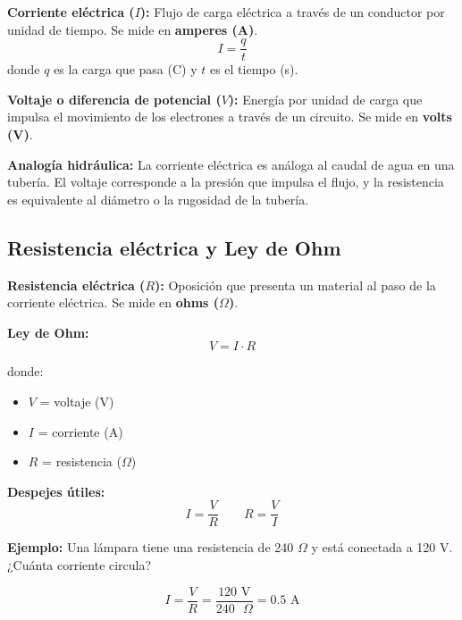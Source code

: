 \begin{seccion}
\begin{definicion}
\textbf{Corriente eléctrica ($I$):} Flujo de carga eléctrica a través de un conductor por unidad de tiempo. Se mide en \textbf{amperes (A)}.
$$I = \frac{q}{t}$$
donde $q$ es la carga que pasa (C) y $t$ es el tiempo (s).
\end{definicion}

\begin{definicion}
\textbf{Voltaje o diferencia de potencial ($V$):} Energía por unidad de carga que impulsa el movimiento de los electrones a través de un circuito. Se mide en \textbf{volts (V)}.
\end{definicion}

\begin{nota}
\textbf{Analogía hidráulica:} La corriente eléctrica es análoga al caudal de agua en una tubería. El voltaje corresponde a la presión que impulsa el flujo, y la resistencia es equivalente al diámetro o la rugosidad de la tubería.
\end{nota}
\end{seccion}

\subsection{Resistencia eléctrica y Ley de Ohm}

\begin{seccion}
\begin{definicion}
\textbf{Resistencia eléctrica ($R$):} Oposición que presenta un material al paso de la corriente eléctrica. Se mide en \textbf{ohms ($\Omega$)}.
\end{definicion}

\begin{ecuacion}
\textbf{Ley de Ohm:}
$$V = I \cdot R$$

donde:
\begin{itemize}
    \item $V$ = voltaje (V)
    \item $I$ = corriente (A)
    \item $R$ = resistencia ($\Omega$)
\end{itemize}

\textbf{Despejes útiles:}
$$I = \frac{V}{R} \qquad R = \frac{V}{I}$$
\end{ecuacion}

\textbf{Ejemplo:} Una lámpara tiene una resistencia de 240 $\Omega$ y está conectada a 120 V. ¿Cuánta corriente circula?

$$I = \frac{V}{R} = \frac{120 \text{ V}}{240 \text{ }\Omega} = 0.5 \text{ A}$$
\end{seccion}

